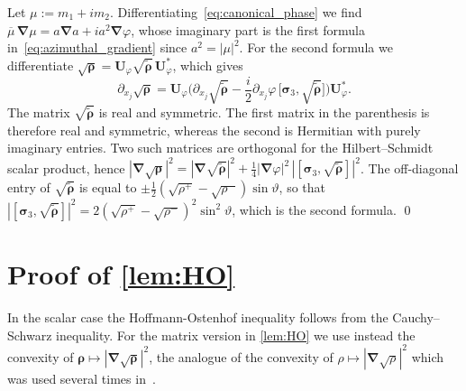 \documentclass[final,reqno]{amsart}
\theoremstyle{remark}
\newcommand{\ol}[1]{\overline{#1}}
\newcommand{\wt}[1]{\widetilde{#1}}
\newcommand{\grad}{\bm{\nabla}}
\begin{document}
Let $\mu:=m_1+im_2$. Differentiating~\cref{eq:canonical_phase} we find $\ol\mu\,\grad\mu=a\grad a+ia^2\grad\varphi$, whose imaginary part is the first formula in~\cref{eq:azimuthal_gradient} since $a^2=|\mu|^2$. For the second formula we differentiate $\sqrt{\bm{\rho}}=\mathbf{U}_\varphi\sqrt{\wt{\bm{\rho}}}\,\mathbf{U}_\varphi^*$, which gives
$$
\partial_{x_j}\sqrt{\bm{\rho}}=\mathbf{U}_\varphi\Big(\partial_{x_j}\sqrt{\wt{\bm{\rho}}}-\frac i2\partial_{x_j}\varphi\,\big[\bm{\sigma}_3,\sqrt{\wt{\bm{\rho}}}\big]\Big)\mathbf{U}_\varphi^*.
$$
The matrix $\sqrt{\wt{\bm{\rho}}}$ is real and symmetric. The first matrix in the parenthesis is therefore real and symmetric, whereas the second is Hermitian with purely imaginary entries. Two such matrices are orthogonal for the Hilbert--Schmidt scalar product, hence $|\grad\sqrt{\bm{\rho}}|^2=|\grad\sqrt{\wt{\bm{\rho}}}|^2+\frac14|\grad\varphi|^2\,|[\bm{\sigma}_3,\sqrt{\wt{\bm{\rho}}}]|^2$. The off-diagonal entry of $\sqrt{\wt{\bm{\rho}}}$ is equal to $\pm\frac12(\sqrt{\rho^+}-\sqrt{\rho^-})\sin\vartheta$, so that $|[\bm{\sigma}_3,\sqrt{\wt{\bm{\rho}}}]|^2=2(\sqrt{\rho^+}-\sqrt{\rho^-})^2\sin^2\vartheta$, which is the second formula.
\qed

\appendix
{}

\section{Proof of \texorpdfstring{\cref{lem:HO}}{the matrix Hoffmann--Ostenhof inequality}}\label{app:HO}
In the scalar case the Hoffmann-Ostenhof inequality follows from the Cauchy--Schwarz inequality. For the matrix version in \cref{lem:HO} we use instead the convexity of $\bm{\rho}\mapsto|\grad\sqrt{\bm{\rho}}|^2$, the analogue of the convexity of $\rho\mapsto|\grad\sqrt\rho|^2$ which was used several times in~\cite{lewin2020local}.
\end{document}
